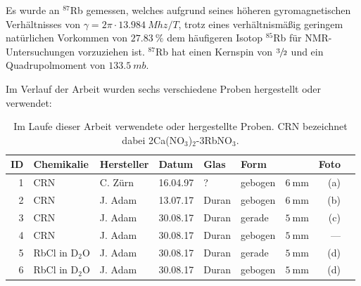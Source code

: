 Es wurde an $^\text{87}$Rb gemessen, welches aufgrund seines höheren gyromagnetischen Verhältnisses von $\gamma = 2\pi \cdot \SI{13.984}{Mhz / T}$, trotz eines verhältnismäßig geringem natürlichen Vorkommen von $\SI{27.83}{\percent}$ dem häufigeren Isotop $^\text{85}$Rb für NMR-Untersuchungen vorzuziehen ist. $^\text{87}$Rb hat einen Kernspin von $\sfrac{3}{2}$ und ein Quadrupolmoment von $\SI{133.5}{mb}$.

Im Verlauf der Arbeit wurden sechs verschiedene Proben hergestellt oder verwendet:

\begin{table}[H]
	\centering
	\begin{tabular}{rllllllrl}
		\hline
		ID & Chemikalie & Hersteller & Datum & Glas & Form & \diameter & Foto \\ 
		\hline
		1	& CRN &	C. Zürn &	16.04.97 &	? &	gebogen & 	$\SI{6}{\milli\meter}$ &	(a) \\
2	& CRN &	J. Adam &	13.07.17 &	Duran &	gebogen & 	$\SI{6}{\milli\meter}$ &	(b) \\
3	& CRN &	J. Adam &	30.08.17 &	Duran &	gerade & 	$\SI{5}{\milli\meter}$ &	(c) \\
4	& CRN &	J. Adam &	30.08.17 &	Duran &	gebogen & 	$\SI{5}{\milli\meter}$ &	--- \\
5	& RbCl in D$_\text{2}$O &	J. Adam &	30.08.17 &	Duran &	gerade & 	$\SI{5}{\milli\meter}$ &	(d) \\
6	& RbCl in D$_\text{2}$O &	J. Adam &	30.08.17 &	Duran &	gebogen & 	$\SI{5}{\milli\meter}$ &	(d) \\ \hline
	\end{tabular} 
	\caption{Im Laufe dieser Arbeit verwendete oder hergestellte Proben. CRN bezeichnet dabei 2Ca(NO$_\text{3}$)$_\text{2}$-3RbNO$_\text{3}$. \label{tab:exp:proben}}
\end{table}

